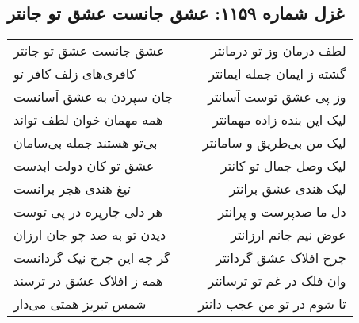 \begin{center}
\section*{غزل شماره ۱۱۵۹: عشق جانست عشق تو جانتر}
\label{sec:1159}
\begin{longtable}{l p{0.5cm} r}
عشق جانست عشق تو جانتر
&&
لطف درمان وز تو درمانتر
\\
کافری‌های زلف کافر تو
&&
گشته ز ایمان جمله ایمانتر
\\
جان سپردن به عشق آسانست
&&
وز پی عشق توست آسانتر
\\
همه مهمان خوان لطف تواند
&&
لیک این بنده زاده مهمانتر
\\
بی‌تو هستند جمله بی‌سامان
&&
لیک من بی‌طریق و سامانتر
\\
عشق تو کان دولت ابدست
&&
لیک وصل جمال تو کانتر
\\
تیغ هندی هجر برانست
&&
لیک هندی عشق برانتر
\\
هر دلی چارپره در پی توست
&&
دل ما صدپرست و پرانتر
\\
دیدن تو به صد چو جان ارزان
&&
عوض نیم جانم ارزانتر
\\
گر چه این چرخ نیک گردانست
&&
چرخ افلاک عشق گردانتر
\\
همه ز افلاک عشق در ترسند
&&
وان فلک در غم تو ترسانتر
\\
شمس تبریز همتی می‌دار
&&
تا شوم در تو من عجب دانتر
\\
\end{longtable}
\end{center}
